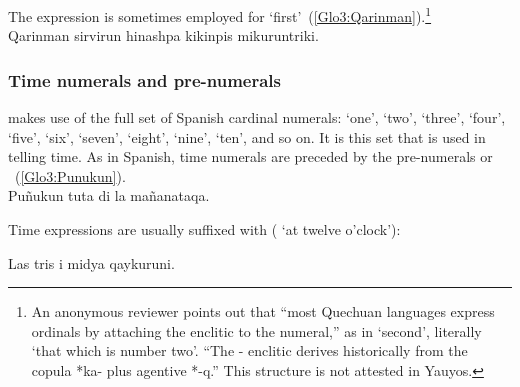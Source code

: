 \noindent
The expression  is sometimes employed for ‘first’~(\ref{Glo3:Qarinman}).\footnote{An anonymous reviewer points out that “most Quechuan languages express ordinals by attaching the enclitic  to the numeral,” as in  ‘second’, literally ‘that which is number two’. “The - enclitic derives historically from the copula *ka- plus agentive *-q.” This structure is not attested in Yauyos.}\\

%
{Qarinman sirvirun  hinashpa kikinpis mikuruntriki.}%
{}%
{}{}%

\subsubsection{Time numerals and pre-numerals}\label{ssec:timenum}
\SYQ{} makes use of the full set of Spanish cardinal numerals:  ‘one’,  ‘two’,  ‘three’,  ‘four’,  ‘five’,  ‘six’,  ‘seven’,  ‘eight’,  ‘nine’,  ‘ten’, and so on. It is this set that is used in telling time. As in Spanish, time numerals are preceded by the pre-numerals  or ~(\ref{Glo3:Punukun}).\\

%
{Puñukun tuta  di la mañanataqa.}%
{}%
{}{}%

\newpage 
\noindent
Time expressions are usually suffixed with  ( ‘at twelve o’clock’):%

%
{Las tris i midya qaykuruni.}%
{}%
{}{}%

